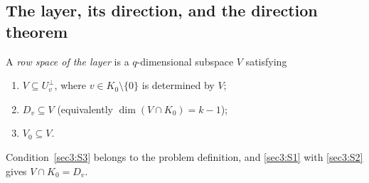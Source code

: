 \subsection{The layer, its direction, and the direction theorem}
\label{sec3:sub:struct}
\label{sec3:sub:direction}
A \emph{row space of the layer} is a $q$-dimensional subspace $V$ satisfying
\begin{enumerate}[label=(S\arabic*),ref={(S\arabic*)},leftmargin=2.6em,itemsep=1pt,topsep=2pt]
\item\label{sec3:S1} $V\subseteq U_v^\perp$, where $v\in K_0\setminus\{0\}$ is determined by $V$;
\item\label{sec3:S2} $D_v\subseteq V$ (equivalently $\dim(V\cap K_0)=k-1$);
\item\label{sec3:S3} $V_0\subseteq V$.
\end{enumerate}
Condition~\ref{sec3:S3} belongs to the problem definition, and \ref{sec3:S1} with \ref{sec3:S2} gives
$V\cap K_0=D_v$.

